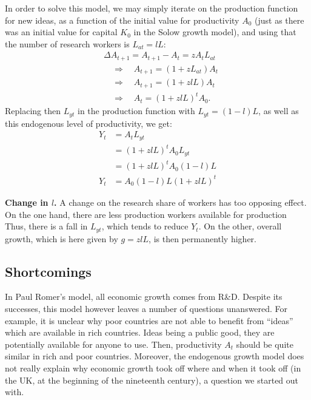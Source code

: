 \documentclass[]{book}
\begin{document}
In order to solve this model, we may simply iterate on the production
function for new ideas, as a function of the initial value for
productivity \(A_0\) (just as there was an initial value for capital
\(K_0\) in the Solow growth model), and using that the number of
research workers is \(L_{at} = l L\): \[
\begin{aligned}
& \Delta A_{t+1} = A_{t+1}-A_t =z A_{t} L_{at}\\
& \quad \Rightarrow \quad  A_{t+1} = (1+z L_{at})A_{t} \\
& \quad \Rightarrow \quad  A_{t+1}=\left(1+zlL\right)A_{t}\\
& \quad \Rightarrow \quad  A_{t}=\left(1+zlL\right)^{t}A_{0}.
\end{aligned}
\] Replacing then \(L_{yt}\) in the production function with
\(L_{yt} = (1-l)L\), as well as this endogenous level of productivity,
we get: \[
\begin{aligned}
Y_{t}&  =A_{t} L_{yt}\\
&= \left(1+zlL\right)^{t}A_{0}L_{yt}\\
&= \left(1+zlL\right)^{t}A_{0}(1-l)L\\
Y_{t}&= A_{0}(1-l)L \left(1+zlL\right)^{t}
\end{aligned}
\]

\textbf{Change in \(l\).} A change on the research share of workers has
too opposing effect. On the one hand, there are less production workers
available for production Thus, there is a fall in \(L_{yt}\), which
tends to reduce \(Y_t\). On the other, overall growth, which is here
given by \(g = zlL\), is then permanently higher.

\subsection{Shortcomings}\label{shortcomings}

In Paul Romer's model, all economic growth comes from R\&D. Despite its
successes, this model however leaves a number of questions unanswered.
For example, it is unclear why poor countries are not able to benefit
from ``ideas'' which are available in rich countries. Ideas being a
public good, they are potentially available for anyone to use. Then,
productivity \(A_t\) should be quite similar in rich and poor countries.
Moreover, the endogenous growth model does not really explain why
economic growth took off where and when it took off (in the UK, at the
beginning of the nineteenth century), a question we started out with.
\end{document}
